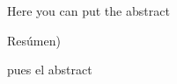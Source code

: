 %
\label{sec:abstract}

Here you can put the abstract 

\vspace*{20mm}

{Resúmen)}
\label{sec:abstract-diff}

pues el abstract 